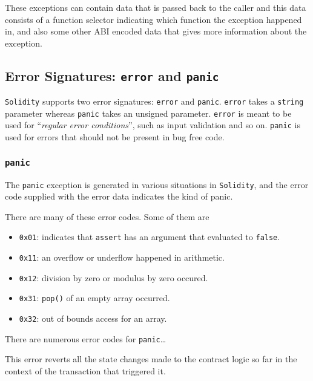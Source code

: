 These exceptions can contain data that is passed back to the caller and
this data consists of a function selector indicating which function the
exception happened in, and also some other ABI encoded data that gives
more information about the exception.

\subsection{\texorpdfstring{Error Signatures: \texttt{error} and
\texttt{panic}}{Error Signatures: error and panic}}\label{error-signatures-error-and-panic}

\texttt{Solidity} supports two error signatures: \texttt{error} and
\texttt{panic}. \texttt{error} takes a \texttt{string} parameter whereas
\texttt{panic} takes an unsigned parameter. \texttt{error} is meant to
be used for ``\emph{regular error conditions}'', such as input
validation and so on. \texttt{panic} is used for errors that should not
be present in bug free code.

\subsubsection{\texorpdfstring{\texttt{panic}}{panic}}\label{panic}

The \texttt{panic} exception is generated in various situations in
\texttt{Solidity}, and the error code supplied with the error data
indicates the kind of panic.

There are many of these error codes. Some of them are

\begin{itemize}
\tightlist
\item
  \texttt{0x01}: indicates that \texttt{assert} has an argument that
  evaluated to \texttt{false}.
\item
  \texttt{0x11}: an overflow or underflow happened in arithmetic.
\item
  \texttt{0x12}: division by zero or modulus by zero occured.
\item
  \texttt{0x31}: \texttt{pop()} of an empty array occurred.
\item
  \texttt{0x32}: out of bounds access for an array.
\end{itemize}

There are numerous error codes for \texttt{panic}\ldots{}

This error reverts all the state changes made to the contract logic so
far in the context of the transaction that triggered it.

